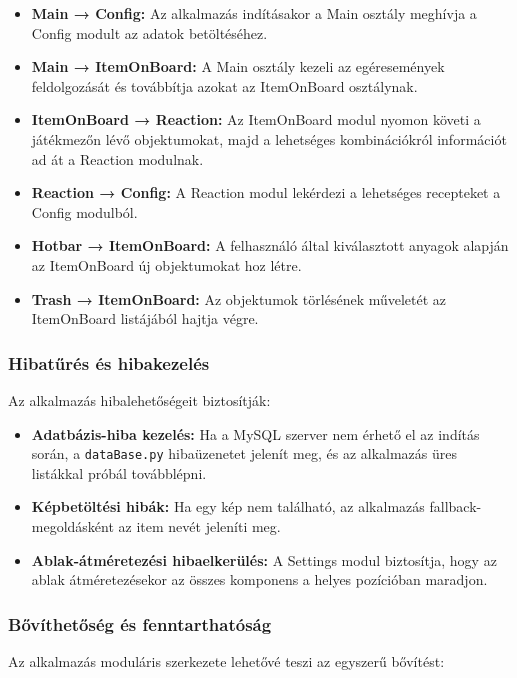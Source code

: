 \documentclass[]{thesis-ekf}
\begin{document}
	\begin{itemize}
		\item \textbf{Main → Config:} Az alkalmazás indításakor a Main osztály meghívja a Config modult az adatok betöltéséhez.
		
		\item \textbf{Main → ItemOnBoard:} A Main osztály kezeli az egéresemények feldolgozását és továbbítja azokat az ItemOnBoard osztálynak.
		
		\item \textbf{ItemOnBoard → Reaction:} Az ItemOnBoard modul nyomon követi a játékmezőn lévő objektumokat, majd a lehetséges kombinációkról információt ad át a Reaction modulnak.
		
		\item \textbf{Reaction → Config:} A Reaction modul lekérdezi a lehetséges recepteket a Config modulból.
		
		\item \textbf{Hotbar → ItemOnBoard:} A felhasználó által kiválasztott anyagok alapján az ItemOnBoard új objektumokat hoz létre.
		
		\item \textbf{Trash → ItemOnBoard:} Az objektumok törlésének műveletét az ItemOnBoard listájából hajtja végre.
	\end{itemize}
	
	
	\subsubsection{Hibatűrés és hibakezelés}
	
	Az alkalmazás hibalehetőségeit biztosítják:
	
	\begin{itemize}
		\item \textbf{Adatbázis-hiba kezelés:} Ha a MySQL szerver nem érhető el az indítás során, a \texttt{dataBase.py} hibaüzenetet jelenít meg, és az alkalmazás üres listákkal próbál továbblépni.
		
		\item \textbf{Képbetöltési hibák:} Ha egy kép nem található, az alkalmazás fallback-megoldásként az item nevét jeleníti meg.
		
		\item \textbf{Ablak-átméretezési hibaelkerülés:} A Settings modul biztosítja, hogy az ablak átméretezésekor az összes komponens a helyes pozícióban maradjon.
	\end{itemize}
	
	\subsubsection{Bővíthetőség és fenntarthatóság}
	Az alkalmazás moduláris szerkezete lehetővé teszi az egyszerű bővítést:
	
\end{document}

